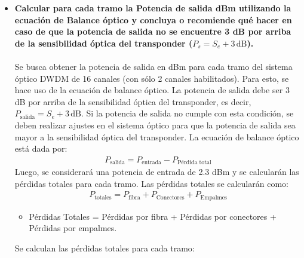 \begin{itemize}
	\item \textbf{Calcular para cada tramo la Potencia de salida dBm utilizando la ecuación de Balance óptico y concluya o recomiende qué hacer en caso de que la potencia de salida no se encuentre 3 dB por arriba de la sensibilidad óptica del transponder ($P_s = S_e + 3 \, \text{dB}$).}\\\\
	Se busca obtener la potencia de salida en dBm para cada tramo del sistema óptico DWDM de 16 canales (con sólo 2 canales habilitados). Para esto, se hace uso de la ecuación de balance óptico. La potencia de salida debe ser 3 dB por arriba de la sensibilidad óptica del transponder, es decir, \(P_{\text{salida}} = S_e + 3 \, \text{dB}\). Si la potencia de salida no cumple con esta condición, se deben realizar ajustes en el sistema óptico para que la potencia de salida sea mayor a la sensibilidad óptica del transponder. La ecuación de balance óptico está dada por:
	\begin{align}
	P_{\text{salida}} = P_{\text{entrada}} - P_{\text{Pérdida total}}
	\end{align}
	Luego, se considerará una potencia de entrada de 2.3 dBm y se calcularán las pérdidas totales para cada tramo. Las pérdidas totales se calcularán como:
	\begin{align}
		P_{\text{totales}} = P_{\text{fibra}} + P_{\text{Conectores}} + P_{\text{Empalmes}}
	\end{align}
\begin{itemize}
    \item Pérdidas Totales = Pérdidas por fibra + Pérdidas por conectores + Pérdidas por empalmes.
\end{itemize}
Se calculan las pérdidas totales para cada tramo:


\end{itemize}
